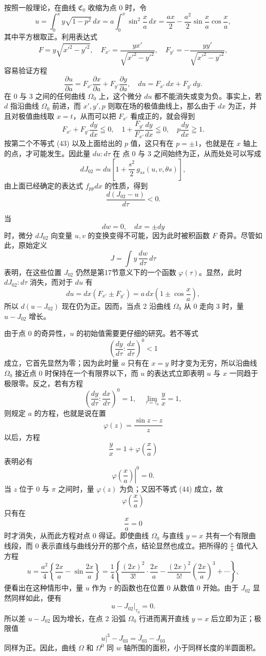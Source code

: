 \documentclass[11pt,a4paper,leqno]{article}
\begin{document}
按照一般理论，在曲线 $\mathfrak{C}_0$ 收缩为点 0 时，令
\[
u=\int_0^x y\sqrt{1-p^2}\,dx
=a\int_0^x\sin^2\frac{x}{a}\,dx
=\frac{ax}{2}-\frac{a^2}{2}\sin\frac{x}{a}\cos\frac{x}{a},
\]
其中平方根取正。利用表达式
\[
F=y\sqrt{x'^2-y'^2},\quad
F_{x'}=\frac{yx'}{\sqrt{x'^2-y'^2}},\quad
F_{y'}=-\frac{yy'}{\sqrt{x'^2-y'^2}},
\]
容易验证方程
\[
\frac{\partial u}{\partial a}
=
F_{x'}\frac{\partial x}{\partial a}
+
F_{y'}\frac{\partial y}{\partial a},
\quad
du=F_{x'}\,dx+F_{y'}\,dy.
\]
在 0 与 3 之间的任何曲线 $\Omega_0$ 上，这个微分 $du$ 都不能消失或变为负。事实上，若 $d$ 指沿曲线 $\Omega_0$ 前进，而 $x',y',p$ 则取在场的极值曲线上，那么由于 $dx$ 为正，并且对极值曲线取 $x=t$，从而可以把 $F_{x'}$ 看成正的，就会得到
\[
F_{x'}+F_{y'}\frac{dy}{dx}\leqq0,\quad
1+\frac{F_{y'}}{F_{x'}}\frac{dy}{dx}\leqq0,\quad
p\frac{dy}{dx}\geqq1.
\]
按第二个不等式 (43) 以及上面给出的 $p$ 值，这只有在 $p=\pm1$，也就是在 $x$ 轴上的点，才可能发生。因此量 $du:d\tau$ 在
点 0 与 3 之间始终为正，从而处处可以写成
\[
dJ_{02}=du\left[1+\frac{s^2}{2}\,g_{ss}(u,v,\theta s)\right],
\]
由上面已经确定的表达式 $f_{pp}dx$ 的性质，得到
\[
\frac{d(J_{02}-u)}{d\tau}<0.
\]

当
\[
dw=0,\quad dx=\pm dy
\]
时，微分 $dJ_{02}$ 向变量 $u,v$ 的变换变得不可能，因为此时被积函数 $F$ 奇异。尽管如此，原始定义
\[
J=\int y\,\frac{dw}{d\tau}\,d\tau
\]
表明，在这些位置 $J_{02}$ 仍然是第17节意义下的一个函数 $\varphi(\tau)$。显然，此时 $dJ_{02}:d\tau$ 消失，而对于 $du$ 有
\[
du=dx(F_{x'}\pm F_{y'})=a\,dx\left(1\pm\cos\frac{x}{a}\right),
\]
所以 $d(u-J_{02})$ 现在仍为正。因而，当点 2 沿曲线 $\Omega_0$ 从 0 走向 3 时，量 $u-J_{02}$ 增长。

由于点 0 的奇异性，$u$ 的初始值需要更仔细的研究。若不等式
\[
\left(\frac{dy}{d\tau}:\frac{dx}{d\tau}\right)^0<1
\]
成立，它首先显然为零；因为此时量 $a$ 只有在 $x=y$ 时才变为无穷，所以沿曲线 $\Omega_0$ 接近点 0 时保持在一个有限界以下，而 $u$ 的表达式立即表明 $u$ 与 $x$ 一同趋于极限零。反之，若有方程
\[
\left(\frac{dy}{d\tau}:\frac{dx}{d\tau}\right)^0=1,\quad
\lim_{\tau=\tau_0}\frac{y}{x}=1,
\]
则规定 $a$ 的方程，也就是说在置
\[
\varphi(z)=\frac{\sin z-z}{z}
\]
以后，方程
\[
\frac{y}{x}=1+\varphi\left(\frac{x}{a}\right)
\]
表明必有
\[
\left.\varphi\left(\frac{x}{a}\right)\right|^0=0.
\]
当 $z$ 位于 0 与 $\pi$ 之间时，量 $\varphi(z)$ 为负；又因不等式 (44) 成立，故
\[
\varphi\left(\frac{x}{a}\right)
\]
只有在
\[
\frac{x}{a}=0
\]
时才消失，从而此方程对点 0 得证。即使曲线 $\Omega_0$ 与直线 $y=x$ 共有一个有限曲线段，而 0 表示直线与曲线分开的那个点，结论显然也成立。把所得的 $\frac{x}{a}$ 值代入方程
\[
u=\frac{a^2}{4}\left\{\frac{2x}{a}-\sin\frac{2x}{a}\right\}
=
\frac{1}{4}\left\{
\frac{(2x)^2}{3!}\cdot\frac{2x}{a}
-
\frac{(2x)^2}{5!}\left(\frac{2x}{a}\right)^3
+\cdots
\right\},
\]
便看出在这种情形中，量 $u$ 作为 $\tau$ 的函数也在位置 0 从数值 0 开始。由于 $J_{02}$ 显然同样如此，便有
\[
\left.u-J_{02}\right|_{\tau_0}=0.
\]
所以差 $u-J_{02}$ 因为增长，在点 2 沿弧 $\Omega_0$ 行进而离开直线 $y=x$ 后立即为正；极限值
\[
\left.u\right|^3-J_{03}=\overline{J}_{03}-J_{03}
\]
同样为正。因此，曲线 $\Omega$ 和 $\Omega^0$ 同 $w$ 轴所围的面积，小于同样长度的半圆面积。
\end{document}
